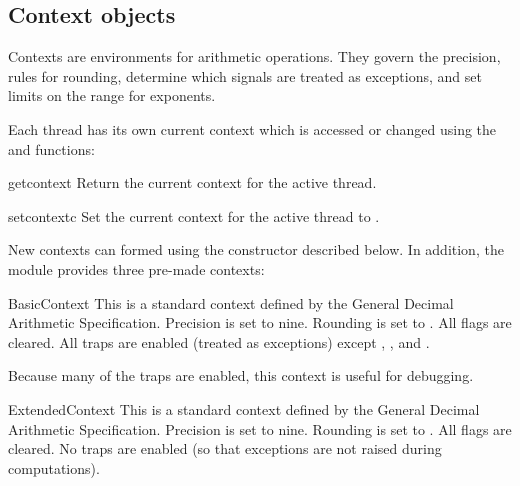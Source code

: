     
\subsection{Context objects \label{decimal-decimal}}

Contexts are environments for arithmetic operations.  They govern the precision,
rules for rounding, determine which signals are treated as exceptions, and set limits
on the range for exponents.

Each thread has its own current context which is accessed or changed using
the  and  functions:

\begin{funcdesc}{getcontext}{}
  Return the current context for the active thread.                                          
\end{funcdesc}            

\begin{funcdesc}{setcontext}{c}
  Set the current context for the active thread to .                                          
\end{funcdesc}  

New contexts can formed using the  constructor described below.
In addition, the module provides three pre-made contexts:                                          


\begin{classdesc*}{BasicContext}
  This is a standard context defined by the General Decimal Arithmetic
  Specification.  Precision is set to nine.  Rounding is set to
  .  All flags are cleared.  All traps are enabled
  (treated as exceptions) except , , and
  .

  Because many of the traps are enabled, this context is useful for debugging.
\end{classdesc*}

\begin{classdesc*}{ExtendedContext}
  This is a standard context defined by the General Decimal Arithmetic
  Specification.  Precision is set to nine.  Rounding is set to
  .  All flags are cleared.  No traps are enabled
  (so that exceptions are not raised during computations).
\end{classdesc*}

